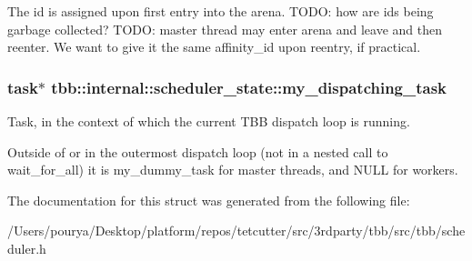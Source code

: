 The id is assigned upon first entry into the arena. T\+O\+D\+O\+: how are id\textquotesingle{}s being garbage collected? T\+O\+D\+O\+: master thread may enter arena and leave and then reenter. We want to give it the same affinity\+\_\+id upon reentry, if practical. \hypertarget{structtbb_1_1internal_1_1scheduler__state_a65d38ed67db424dde8e838e333b09a34}{}
\subsubsection[{my\+\_\+dispatching\+\_\+task}]{\setlength{\rightskip}{0pt plus 5cm}task$\ast$ tbb\+::internal\+::scheduler\+\_\+state\+::my\+\_\+dispatching\+\_\+task}\label{structtbb_1_1internal_1_1scheduler__state_a65d38ed67db424dde8e838e333b09a34}


Task, in the context of which the current T\+B\+B dispatch loop is running. 

Outside of or in the outermost dispatch loop (not in a nested call to wait\+\_\+for\+\_\+all) it is my\+\_\+dummy\+\_\+task for master threads, and N\+U\+L\+L for workers. 

The documentation for this struct was generated from the following file\+:\begin{DoxyCompactItemize}
\item 
/\+Users/pourya/\+Desktop/platform/repos/tetcutter/src/3rdparty/tbb/src/tbb/scheduler.\+h\end{DoxyCompactItemize}
